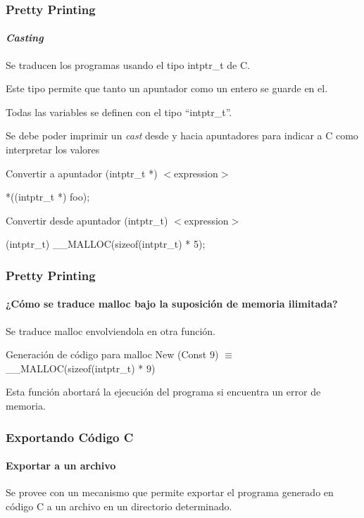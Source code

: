 \begin{frame}
\frametitle{Pretty Printing}
\framesubtitle{\textit{Casting}}

Se traducen los programas usando el tipo intptr\_t de C.
\bigskip

Este tipo permite que tanto un apuntador como un entero se guarde en el.

Todas las variables se definen con el tipo ``intptr\_t''.

\bigskip

Se debe poder imprimir un \textit{cast} desde y hacia apuntadores para indicar a C como interpretar los valores

\bigskip
\pause

\begin{block}{Convertir a apuntador}
(intptr\_t *) $<$expression$>$

*((intptr\_t *) foo);
\end{block}

\begin{block}{Convertir desde apuntador}
(intptr\_t) $<$expression$>$

(intptr\_t) \_\_MALLOC(sizeof(intptr\_t) * 5);
\end{block}


\end{frame}


\begin{frame}
\frametitle{Pretty Printing}
\framesubtitle{¿Cómo se traduce malloc bajo la suposición de memoria ilimitada?}

Se traduce malloc envolviendola en otra función.

\begin{block}{Generación de código para malloc}
New (Const $9$) $\equiv$ \_\_MALLOC(sizeof(intptr\_t) * $9$)
\end{block}

\bigskip

Esta función abortará la ejecución del programa si encuentra un error de memoria.


\end{frame}


\begin{frame}
\frametitle{Exportando Código C}
\framesubtitle{Exportar a un archivo}

Se provee con un mecanismo que permite exportar el programa generado en código C a un archivo en un directorio determinado.


\end{frame}
